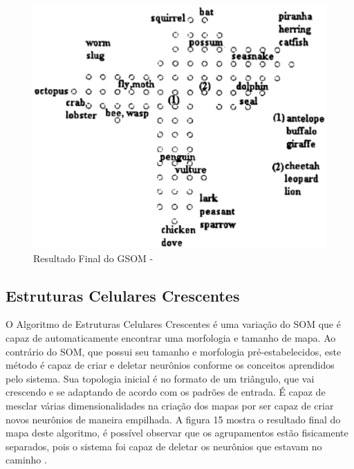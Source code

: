 \begin{figure}[!h]
\centering
\includegraphics[keepaspectratio=true,scale=0.50]
{figuras/gsom.eps}
\caption{Resultado Final do GSOM - }
\label{data_titatic}
\end{figure}

\subsection{Estruturas Celulares Crescentes}
O Algoritmo de Estruturas Celulares Crescentes é uma variação do SOM que é capaz de automaticamente encontrar uma morfologia e tamanho de mapa. Ao contrário do SOM, que possui seu tamanho e morfologia pré-estabelecidos, este método é capaz de criar e deletar neurônios conforme os conceitos aprendidos pelo sistema. Sua topologia inicial é no formato de um triângulo, que vai crescendo e se adaptando de acordo com os padrões de entrada. É capaz de mesclar várias dimensionalidades na criação dos mapas por ser capaz de criar novos neurônios de maneira empilhada. A figura 15 mostra o resultado final do mapa deste algoritmo, é possível observar que os agrupamentos estão fisicamente separados, pois o sistema foi capaz de deletar os neurônios que estavam no caminho \cite{cellsom2000}.

